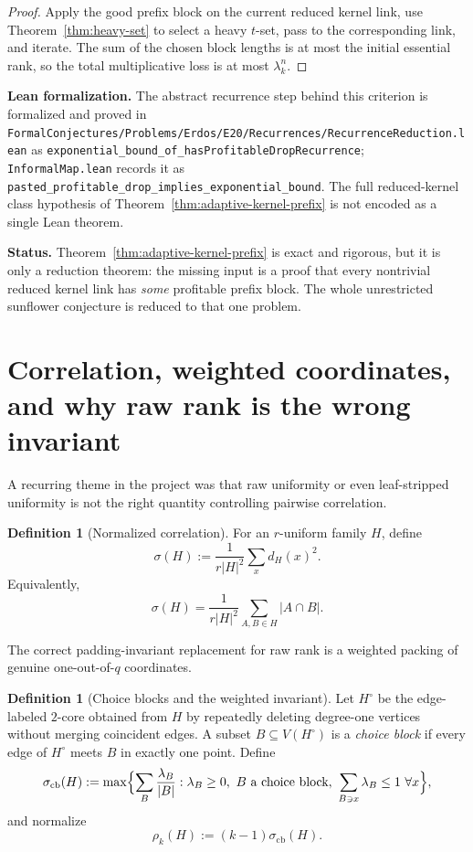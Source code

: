 \documentclass[11pt]{article}
\theoremstyle{definition}
\newtheorem{definition}[theorem]{Definition}
\newcommand{\1}{\mathbf{1}}
\newcommand{\status}[1]{\par\smallskip\noindent\textbf{Status.} #1\par\smallskip}
\newcommand{\leannote}[1]{\par\smallskip\noindent\textbf{Lean formalization.} #1\par\smallskip}
\begin{document}
\begin{proof}
Apply the good prefix block on the current reduced kernel link, use Theorem~\ref{thm:heavy-set} to select a heavy $t$-set, pass to the corresponding link, and iterate. The sum of the chosen block lengths is at most the initial essential rank, so the total multiplicative loss is at most $\lambda_k^n$.
\end{proof}

\leannote{The abstract recurrence step behind this criterion is formalized and proved in \texttt{FormalConjectures/Problems/Erdos/E20/Recurrences/RecurrenceReduction.lean} as \texttt{exponential\_bound\_of\_hasProfitableDropRecurrence}; \texttt{InformalMap.lean} records it as \texttt{pasted\_profitable\_drop\_implies\_exponential\_bound}. The full reduced-kernel class hypothesis of Theorem~\ref{thm:adaptive-kernel-prefix} is not encoded as a single Lean theorem.}

\status{Theorem~\ref{thm:adaptive-kernel-prefix} is exact and rigorous, but it is only a reduction theorem: the missing input is a proof that every nontrivial reduced kernel link has \emph{some} profitable prefix block. The whole unrestricted sunflower conjecture is reduced to that one problem.}

\section{Correlation, weighted coordinates, and why raw rank is the wrong invariant}\label{sec:correlation}
A recurring theme in the project was that raw uniformity or even leaf-stripped uniformity is not the right quantity controlling pairwise correlation.

\begin{definition}[Normalized correlation]
For an $r$-uniform family $H$, define
\[
\sigma(H):=\frac{1}{r|H|^2}\sum_x d_H(x)^2.
\]
Equivalently,
\[
\sigma(H)=\frac{1}{r|H|^2}\sum_{A,B\in H}|A\cap B|.
\]
\end{definition}

The correct padding-invariant replacement for raw rank is a weighted packing of genuine one-out-of-$q$ coordinates.

\begin{definition}[Choice blocks and the weighted invariant]
Let $H^{\circ}$ be the edge-labeled $2$-core obtained from $H$ by repeatedly deleting degree-one vertices without merging coincident edges. A subset $B\subseteq V(H^{\circ})$ is a \emph{choice block} if every edge of $H^{\circ}$ meets $B$ in exactly one point. Define
\[
\sigma_{\mathrm{cb}}(H):=\max\Bigl\{\sum_B \frac{\lambda_B}{|B|}:
\lambda_B\ge 0,\ B\text{ a choice block},\ \sum_{B\ni x}\lambda_B\le 1\ \forall x\Bigr\},
\]
and normalize
\[
\rho_k(H):=(k-1)\sigma_{\mathrm{cb}}(H).
\]
\end{definition}
\end{document}
